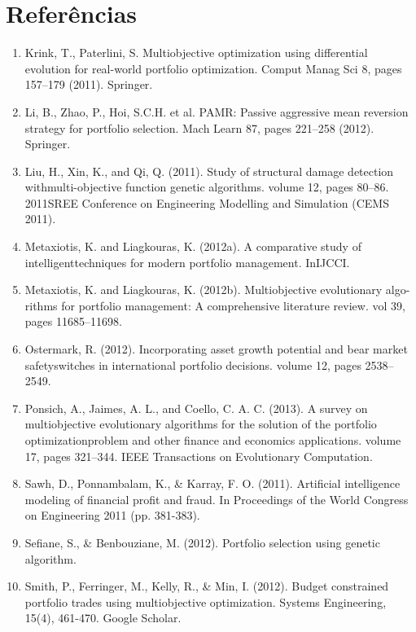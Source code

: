 \documentclass[12pt]{article}
\begin{document}
\section{Referências}

    \begin{enumerate}
     
      \item Krink, T., Paterlini, S. Multiobjective optimization using differential evolution for real-world portfolio optimization. Comput Manag Sci 8, pages 157–179 (2011). Springer.
      \item Li, B., Zhao, P., Hoi, S.C.H. et al. PAMR: Passive aggressive mean reversion strategy for portfolio selection. Mach Learn 87, pages 221–258 (2012). Springer.
      \item Liu, H., Xin, K., and Qi, Q. (2011).  Study of structural damage detection withmulti-objective function genetic algorithms.   volume 12, pages 80–86.   2011SREE Conference on Engineering Modelling and Simulation (CEMS 2011).
      \item Metaxiotis, K. and Liagkouras, K. (2012a).   A comparative study of intelligenttechniques for modern portfolio management. InIJCCI.
      \item Metaxiotis, K.  and  Liagkouras,  K.  (2012b).   Multiobjective  evolutionary  algo-rithms  for  portfolio  management:   A  comprehensive  literature  review.    vol 39, pages 11685–11698.
      \item Ostermark, R. (2012). Incorporating asset growth potential and bear market safetyswitches in international portfolio decisions. volume 12, pages 2538–2549.
      \item Ponsich, A., Jaimes, A. L., and Coello, C. A. C. (2013).  A survey on multiobjective evolutionary algorithms for the solution of the portfolio optimizationproblem and other finance and economics applications. volume 17, pages 321–344. IEEE Transactions on Evolutionary Computation.
      \item Sawh, D., Ponnambalam, K., \& Karray, F. O. (2011). Artificial intelligence modeling of financial profit and fraud. In Proceedings of the World Congress on Engineering 2011 (pp. 381-383).
      \item Sefiane, S., \& Benbouziane, M. (2012). Portfolio selection using genetic algorithm.
      \item Smith, P., Ferringer, M., Kelly, R., \& Min, I. (2012). Budget constrained portfolio trades using multiobjective optimization. Systems Engineering, 15(4), 461-470. Google Scholar.

\end{enumerate}
\end{document}
